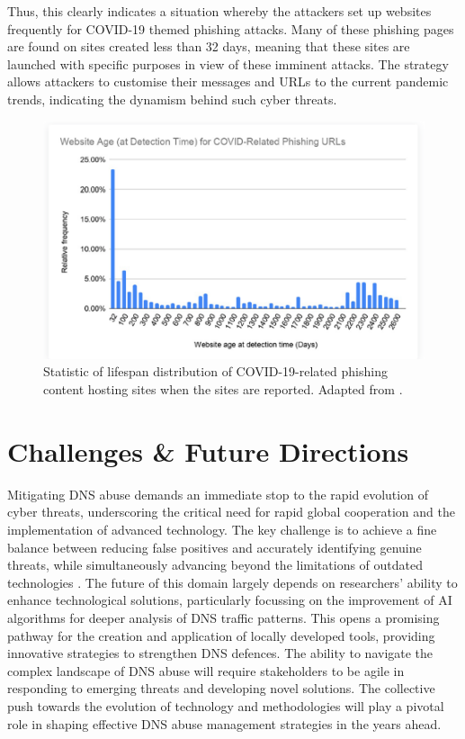 Thus, this clearly indicates a situation whereby the attackers set up websites frequently for COVID-19 themed phishing attacks. Many of these phishing pages are found on sites created less than 32 days, meaning that these sites are launched with specific purposes in view of these imminent attacks. The strategy allows attackers to customise their messages and URLs to the current pandemic trends, indicating the dynamism behind such cyber threats.

\captionsetup{font= footnotesize}
\begin{figure}[H]
    \centering
    \includegraphics[width=0.8\linewidth]{background/AgeCovid.png}
    \caption{Statistic of lifespan distribution of COVID-19-related phishing content hosting sites when the sites are reported. Adapted from \cite{Unit42AtricleCovidPhishing2021}.}
    \label{fig:figSixteen}
\end{figure}


\section{Challenges \& Future Directions}

Mitigating DNS abuse demands an immediate stop to the rapid evolution of cyber threats, underscoring the critical need for rapid global cooperation and the implementation of advanced technology. The key challenge is to achieve a fine balance between reducing false positives and accurately identifying genuine threats, while simultaneously advancing beyond the limitations of outdated technologies \cite{pour2023comprehensive}. The future of this domain largely depends on researchers' ability to enhance technological solutions, particularly focussing on the improvement of AI algorithms for deeper analysis of DNS traffic patterns. This opens a promising pathway for the creation and application of locally developed tools, providing innovative strategies to strengthen DNS defences. The ability to navigate the complex landscape of DNS abuse will require stakeholders to be agile in responding to emerging threats and developing novel solutions. The collective push towards the evolution of technology and methodologies will play a pivotal role in shaping effective DNS abuse management strategies in the years ahead.


